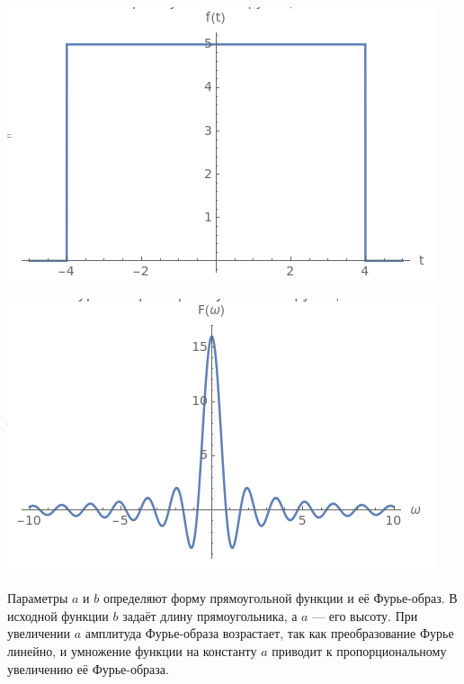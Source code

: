 \documentclass[a4paper,12pt]{article}
\begin{document}
\begin{center}
\begin{minipage}{0.48\textwidth}
  \centering
  \includegraphics[width=\linewidth]{images/1f54.png}
\end{minipage}
\hfill
\begin{minipage}{0.48\textwidth}
  \centering
  \includegraphics[width=\linewidth]{images/1F54.png}
\end{minipage}
\end{center}



Параметры \( a \) и \( b \) определяют форму прямоугольной функции и её Фурье-образ. В исходной функции \( b \) задаёт длину прямоугольника, а \( a \) — его высоту. При увеличении \( a \) амплитуда Фурье-образа возрастает, так как преобразование Фурье линейно, и умножение функции на константу \( a \) приводит к пропорциональному увеличению её Фурье-образа.
\end{document}
